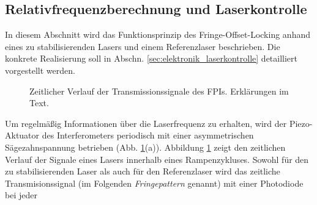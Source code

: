 \subsection{Relativfrequenzberechnung
und Laserkontrolle}\label{subsec:relativfrequenzberechnung_und_laserkontrolle}
In diesem Abschnitt wird das Funktionsprinzip des Fringe-Offset-Locking anhand
eines zu stabilisierenden Lasers und einem Referenzlaser beschrieben. Die
konkrete Realisierung soll in Abschn. \ref{sec:elektronik_laserkontrolle}
detailliert vorgestellt werden.\par
\begin{figure}[h]
 	\centering
	\caption[Zeitlicher Verlauf
	FPI-Transmission]{Zeitlicher Verlauf der
	Transmissionssignale des FPIs. Erklärungen im Text.}\label{fig:FPI_signal-zeitverlauf}
\end{figure}
Um regelmäßig Informationen über die Laserfrequenz zu erhalten, wird der
Piezo-Aktuator des Interferometers periodisch mit einer asymmetrischen
Sägezahnspannung betrieben (Abb. \ref{fig:FPI_signal-zeitverlauf}(a)). Abbildung
\ref{fig:FPI_signal-zeitverlauf} zeigt den zeitlichen Verlauf der Signale eines
Lasers innerhalb eines Rampenzykluses. Sowohl für den zu stabilisierenden
Laser als auch für den Referenzlaser wird das zeitliche Transmisionssignal (im
Folgenden \textit{Fringepattern} genannt) mit einer Photodiode bei jeder
